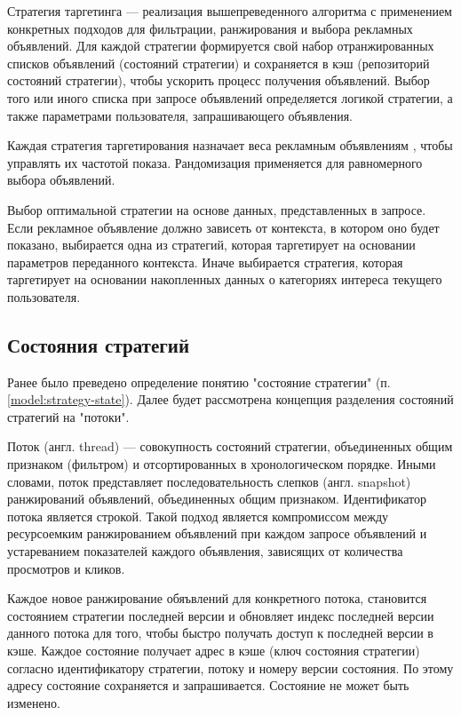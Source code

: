 \documentclass[specification,annotation,times]{itmo-student-thesis}
\begin{document}
Стратегия таргетинга — реализация вышепреведенного алгоритма с применением конкретных подходов для фильтрации, ранжирования и выбора рекламных объявлений. Для каждой стратегии формируется свой набор отранжированных списков объявлений (состояний стратегии) и сохраняется в кэш (репозиторий состояний стратегии), чтобы ускорить процесс получения объявлений. Выбор того или иного списка при запросе объявлений определяется логикой стратегии, а также параметрами пользователя, запрашивающего объявления. 

Каждая стратегия таргетирования назначает веса рекламным объявлениям \cite{creative-sequencing}, чтобы управлять их частотой показа. Рандомизация применяется для равномерного выбора объявлений. 

Выбор оптимальной стратегии на основе данных, представленных в запросе. Если рекламное объявление должно зависеть от контекста, в котором оно будет показано, выбирается одна из стратегий, которая таргетирует на основании параметров переданного контекста. Иначе выбирается стратегия, которая таргетирует на основании накопленных данных о категориях интереса текущего пользователя.

\subsection{Состояния стратегий}\label{sec:strategies-state}

Ранее было преведено определение понятию "состояние стратегии" (п. \ref{model:strategy-state}). Далее будет рассмотрена концепция разделения состояний стратегий на "потоки".

Поток (англ. thread) — совокупность состояний стратегии, объединенных общим признаком (фильтром) и отсортированных в хронологическом порядке. Иными словами, поток представляет последовательность слепков (англ. snapshot) ранжирований объявлений, объединенных общим признаком. Идентификатор потока является строкой. Такой подход является компромиссом между ресурсоемким ранжированием объявлений при каждом запросе объявлений и устареванием показателей каждого объявления, зависящих от количества просмотров и кликов. 

Каждое новое ранжирование обяъвлений для конкретного потока, становится состоянием стратегии последней версии и обновляет индекс последней версии данного потока для того, чтобы быстро получать доступ к последней версии в кэше. Каждое состояние получает адрес в кэше (ключ состояния стратегии) согласно идентификатору стратегии, потоку и номеру версии состояния. По этому адресу состояние сохраняется и запрашивается. Состояние не может быть изменено.
\end{document}
